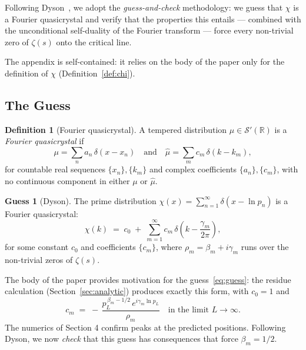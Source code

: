 \documentclass[11pt, oneside]{article}
\theoremstyle{definition}
\newtheorem{definition}[theorem]{Definition}
\newtheorem{guess}[theorem]{Guess}
\begin{document}
Following Dyson~\cite{Dyson2009}, we adopt the
\emph{guess-and-check} methodology: we guess that $\chi$ is a
Fourier quasicrystal and verify that the properties this entails
--- combined with the unconditional self-duality of the Fourier
transform --- force every non-trivial zero of $\zeta(s)$ onto the
critical line.

The appendix is self-contained: it relies on the body of the
paper only for the definition of $\chi$
(Definition~\ref{def:chi}).

\subsection{The Guess}
\label{app:guess}

\begin{definition}[Fourier quasicrystal]
\label{def:fourier_qc}
A tempered distribution $\mu \in \mathcal{S}'(\mathbb{R})$ is a
\emph{Fourier quasicrystal} if
\begin{equation}
  \mu = \sum_n a_n\,\delta(x - x_n)
  \quad\text{and}\quad
  \hat\mu = \sum_m c_m\,\delta(k - k_m),
\end{equation}
for countable real sequences $\{x_n\},\{k_m\}$ and complex
coefficients $\{a_n\},\{c_m\}$, with no continuous component in
either $\mu$ or $\hat\mu$.
\end{definition}

\begin{guess}[Dyson]
\label{guess:chi}
The prime distribution
$\chi(x) = \sum_{n=1}^\infty \delta(x - \ln p_n)$
is a Fourier quasicrystal:
\begin{equation}
  \hat\chi(k)
   \;=\; c_0 \;+\; \sum_{m=1}^\infty c_m\,
                    \delta\!\left(k - \frac{\gamma_m}{2\pi}\right),
  \label{eq:guess}
\end{equation}
for some constant $c_0$ and coefficients $\{c_m\}$, where
$\rho_m = \beta_m + i\gamma_m$ runs over the non-trivial zeros
of $\zeta(s)$.
\end{guess}

The body of the paper provides motivation for the
guess~\eqref{eq:guess}: the residue calculation
(Section~\ref{sec:analytic}) produces exactly this form, with
$c_0 = 1$ and
\begin{equation}
  c_m \;=\; -\,\frac{p_L^{\,\beta_m - 1/2}\,
                       e^{i\gamma_m \ln p_L}}{\rho_m}
   \quad\text{in the limit } L \to \infty.
  \label{eq:cm}
\end{equation}
The numerics of Section 4 confirm peaks at the predicted
positions. Following Dyson, we now \emph{check} that this
guess has consequences that force $\beta_m = 1/2$.
\end{document}
